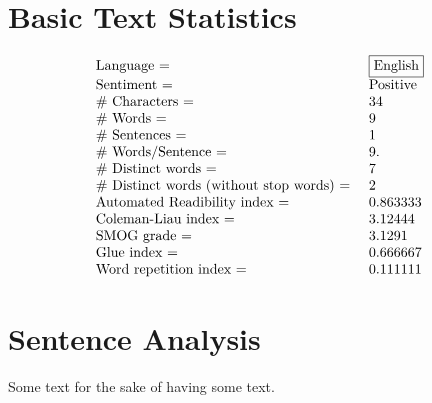 \documentclass{amsart}
\begin{document}
\section{Basic Text Statistics}
 \[\begin{array}{ll}
 \text{Language = } & \fbox{$\text{English}$} \\
 \text{Sentiment = } & \text{Positive} \\
 \text{$\#$ Characters = } & 34 \\
 \text{$\#$ Words = } & 9 \\
 \text{$\#$ Sentences = } & 1 \\
 \text{$\#$ Words/Sentence = } & 9. \\
 \text{$\#$ Distinct words = } & 7 \\
 \text{$\#$ Distinct words (without stop words) = } & 2 \\
 \text{Automated Readibility index = } & 0.863333 \\
 \text{Coleman-Liau index = } & 3.12444 \\
 \text{SMOG grade = } & 3.1291 \\
 \text{Glue index = } & 0.666667 \\
 \text{Word repetition index = } & 0.111111 \\
\end{array}\]

\section{Sentence Analysis} Some text for the sake of having some text.

\noindent  
\end{document}
